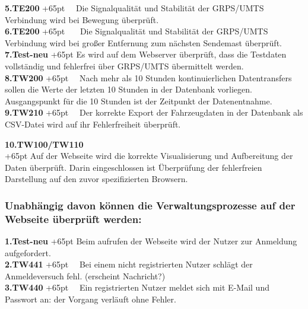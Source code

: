\documentclass[fontsize = 12pt, paper = a4]{scrreprt}
\begin{document}
\textbf{5.TE200}
\hangindent+65pt  
\ \ Die Signalqualität und Stabilität der GRPS/UMTS Verbindung wird bei Bewegung überprüft.\\

\textbf{6.TE200}
\hangindent+65pt  
\ \ \  Die Signalqualität und Stabilität der GRPS/UMTS Verbindung wird bei großer Entfernung zum nächsten Sendemast überprüft.\\

\textbf{7.Test-neu}
\hangindent+65pt 
 Es wird auf dem Webserver überprüft, dass die Testdaten vollständig und fehlerfrei über GRPS/UMTS übermittelt werden.\\
 
\textbf{8.TW200}
\hangindent+65pt 
\ \  Nach mehr als 10 Stunden kontinuierlichen Datentransfers sollen die Werte der letzten 10 Stunden in der Datenbank vorliegen. Ausgangspunkt für die 10 Stunden ist der Zeitpunkt der Datenentnahme.\\
 
\textbf{9.TW210}
\hangindent+65pt 
\ \ Der korrekte Export der Fahrzeugdaten in der Datenbank als CSV-Datei wird auf ihr Fehlerfreiheit überprüft.\\

\newpage

\textbf{10.TW100/TW110}\\
\hangindent+65pt 
Auf der Webseite wird die korrekte Visualisierung und Aufbereitung der Daten überprüft. Darin eingeschlossen ist Überprüfung der fehlerfreien Darstellung auf den zuvor spezifizierten Browsern. \\




\subsubsection*{Unabhängig davon können die Verwaltungsprozesse auf der Webseite überprüft werden:}


\textbf{1.Test-neu}
\hangindent+65pt 
Beim aufrufen der Webseite wird der Nutzer zur Anmeldung aufgefordert.\\

\textbf{2.TW441}
\hangindent+65pt 
\ \ Bei einem nicht registrierten Nutzer schlägt der Anmeldeversuch fehl. (erscheint Nachricht?)\\
 
\textbf{3.TW440}
\hangindent+65pt 
\ \ Ein registrierten Nutzer meldet sich mit E-Mail und Passwort an: der Vorgang verläuft ohne Fehler.\\
 
\end{document}
